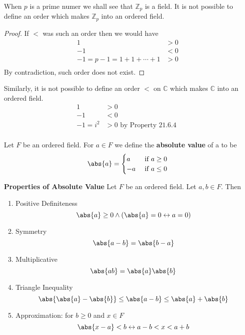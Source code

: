 \begin{exmp}
When $p$ is a prime numer we shall see that $\mathbb{Z}_p$ is a field. It is not possible to define an order which makes $\mathbb{Z}_p$ into an ordered field.
\end{exmp}
\begin{proof}
If $<$ was such an order then we would have
\begin{align*}
    1 & > 0\\
    -1 & < 0 \\
    -1 = p-1 = 1+ 1+\cdots + 1 &> 0\\
\end{align*}
By contradiction, such order does not exist.
\end{proof}

Similarly, it is not possible to define an order $<$ on $\mathbb{C}$ which makes $\mathbb{C}$ into an ordered field.
\begin{align*}
    1 & > 0\\
    -1 & < 0 \\
    -1 = i^2 & > 0 \text{ by Property 21.6.4 }\\
\end{align*}

\begin{defn}
Let $F$ be an ordered field. For $a\in F$ we define the \textbf{absolute value} of a to be \begin{equation*}
    \abs{a} = \begin{cases}
            a & \text{ if } a\geq 0\\
            -a & \text{ if } a\leq 0
            \end{cases}
\end{equation*}
\end{defn}

\begin{thm}\textbf{Properties of Absolute Value}
Let $F$ be an ordered field. Let $a,b\in F$. Then
\begin{enumerate}
\item Positive Definiteness \[\abs{a} \geq 0 \wedge (\abs{a} = 0 \leftrightarrow a=0)\]
\item Symmetry \[\abs{a-b} = \abs{b-a}\]
\item Multiplicative \[\abs{ab} = \abs{a}\abs{b}\]
\item Triangle Inequality \[\abs{\abs{a} - \abs{b}} \leq \abs{a-b} \leq \abs{a} + \abs{b}\]
\item Approximation: for $b\geq 0$ and $x\in F$ \[\abs{x-a} < b \leftrightarrow a-b < x < a+b\]
\end{enumerate}
\end{thm}

